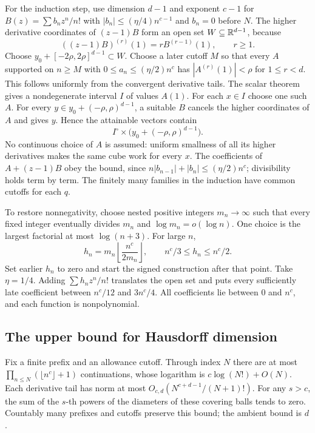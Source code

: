 \documentclass[11pt]{article}
\begin{document}
For the induction step, use dimension $d-1$ and exponent $c-1$ for
$B(z)=\sum b_nz^n/n!$ with $|b_n|\le(\eta/4)n^{c-1}$ and $b_n=0$
before $N$. The higher derivative coordinates of $(z-1)B$ form an open
set $W\subseteq\mathbb{R}^{d-1}$, because
\[
 ((z-1)B)^{(r)}(1)=rB^{(r-1)}(1),\qquad r\ge1.
\]
Choose $y_0+[-2\rho,2\rho]^{d-1}\subset W$. Choose a later cutoff $M$
so that every $A$ supported on $n\ge M$ with
$0\le a_n\le(\eta/2)n^c$ has $|A^{(r)}(1)|<\rho$ for $1\le r<d$.
This follows uniformly from the convergent derivative tails. The scalar
theorem gives a nondegenerate interval $I$ of values $A(1)$.
For each $x\in I$ choose one such $A$. For every
$y\in y_0+(-\rho,\rho)^{d-1}$, a suitable $B$ cancels the higher
coordinates of $A$ and gives $y$. Hence the attainable vectors contain
\[
 I^\circ\times\bigl(y_0+(-\rho,\rho)^{d-1}\bigr).
\]
No continuous choice of $A$ is assumed: uniform smallness of all its higher
derivatives makes the same cube work for every $x$.
The coefficients of $A+(z-1)B$ obey the bound, since
$n|b_{n-1}|+|b_n|\le(\eta/2)n^c$; divisibility holds term by term.
The finitely many families in the induction have common cutoffs for each $q$.

To restore nonnegativity, choose nested positive integers $m_n\to\infty$
such that every fixed integer eventually divides $m_n$ and
$\log m_n=o(\log n)$. One choice is the largest factorial at most
$\log(n+3)$. For large $n$,
\[
 h_n=m_n\left\lfloor\frac{n^c}{2m_n}\right\rfloor,
 \qquad n^c/3\le h_n\le n^c/2.
\]
Set earlier $h_n$ to zero and start the signed construction after that point.
Take $\eta=1/4$. Adding $\sum h_nz^n/n!$ translates the open set and
puts every sufficiently late coefficient between $n^c/12$ and $3n^c/4$.
All coefficients lie between $0$ and $n^c$, and each function is nonpolynomial.

\subsection{The upper bound for Hausdorff dimension}
Fix a finite prefix and an allowance cutoff. Through index $N$ there are
at most $\prod_{n\le N}(\lfloor n^c\rfloor+1)$ continuations, whose
logarithm is $c\log(N!)+O(N)$. Each derivative tail has norm at most
$O_{c,d}(N^{c+d-1}/(N+1)!)$. For any $s>c$, the sum of the $s$-th powers
of the diameters of these covering balls tends to zero. Countably many
prefixes and cutoffs preserve this bound; the ambient bound is $d$.
\end{document}
